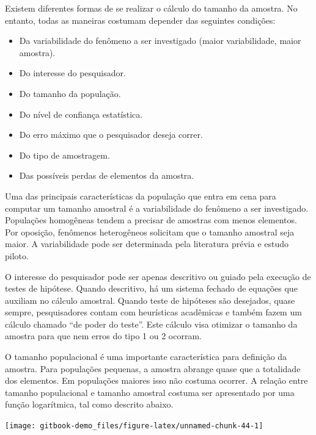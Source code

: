 \documentclass[
]{book}
\providecommand{\tightlist}{%
  \setlength{\itemsep}{0pt}\setlength{\parskip}{0pt}}
\begin{document}
Existem diferentes formas de se realizar o cálculo do tamanho da amostra. No entanto, todas as maneiras costumam depender das seguintes condições:

\begin{itemize}
\tightlist
\item
  Da variabilidade do fenômeno a ser investigado (maior variabilidade, maior amostra).\\
\item
  Do interesse do pesquisador.\\
\item
  Do tamanho da população.\\
\item
  Do nível de confiança estatística.\\
\item
  Do erro máximo que o pesquisador deseja correr.\\
\item
  Do tipo de amostragem.
\item
  Das possíveis perdas de elementos da amostra.
\end{itemize}

Uma das principais características da população que entra em cena para computar um tamanho amostral é a variabilidade do fenômeno a ser investigado. Populações homogêneas tendem a precisar de amostras com menos elementos. Por oposição, fenômenos heterogêneos solicitam que o tamanho amostral seja maior. A variabilidade pode ser determinada pela literatura prévia e estudo piloto.

O interesse do pesquisador pode ser apenas descritivo ou guiado pela execução de testes de hipótese. Quando descritivo, há um sistema fechado de equações que auxiliam no cálculo amostral. Quando teste de hipóteses são desejados, quase sempre, pesquisadores contam com heurísticas acadêmicas e também fazem um cálculo chamado ``de poder do teste''. Este cálculo visa otimizar o tamanho da amostra para que nem erros do tipo 1 ou 2 ocorram.

O tamanho populacional é uma importante característica para definição da amostra. Para populações pequenas, a amostra abrange quase que a totalidade dos elementos. Em populações maiores isso não costuma ocorrer. A relação entre tamanho populacional e tamanho amostral costuma ser apresentado por uma função logarítmica, tal como descrito abaixo.

\begin{center}\texttt{[image: gitbook-demo\_files/figure-latex/unnamed-chunk-44-1]} \end{center}
\end{document}
